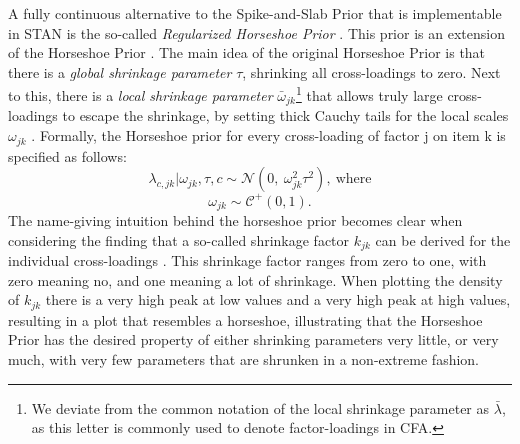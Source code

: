 \documentclass[]{interact}
\theoremstyle{plain}%
\theoremstyle{definition}
\theoremstyle{remark}
\begin{document}
A fully continuous alternative to the Spike-and-Slab Prior that is
implementable in STAN is the so-called \emph{Regularized Horseshoe
Prior}
\citep[RHSP,][]{piironen_hyperprior_2017, piironen_sparsity_2017}. This
prior is an extension of the Horseshoe Prior
\citep{carvalho_horseshoe_2010}. The main idea of the original Horseshoe
Prior is that there is a \emph{global shrinkage parameter} \(\tau\),
shrinking all cross-loadings to zero. Next to this, there is a
\emph{local shrinkage parameter} \(\bar{\omega}_{jk}\)\footnote{We
  deviate from the common notation of the local shrinkage parameter as
  \(\bar{\lambda}\), as this letter is commonly used to denote
  factor-loadings in CFA.} that allows truly large cross-loadings to
escape the shrinkage, by setting thick Cauchy tails for the local scales
\(\omega_{jk}\) \citep{polson_shrink_2010}. Formally, the Horseshoe
prior for every cross-loading of factor j on item k is specified as
follows:
\[\lambda_{c,jk} | \omega_{jk}, \tau, c\sim \mathcal{N}(0, \ \omega^2_{jk} \tau^2), \ \text{where}\]
\[\omega_{jk} \sim \mathcal{C^+}(0, 1).\] The name-giving intuition
behind the horseshoe prior becomes clear when considering the finding
that a so-called shrinkage factor \(k_{jk}\) can be derived for the
individual cross-loadings
\citep{carvalho_horseshoe_2010, piironen_sparsity_2017}. This shrinkage
factor ranges from zero to one, with zero meaning no, and one meaning a
lot of shrinkage. When plotting the density of \(k_{jk}\) there is a
very high peak at low values and a very high peak at high values,
resulting in a plot that resembles a horseshoe, illustrating that the
Horseshoe Prior has the desired property of either shrinking parameters
very little, or very much, with very few parameters that are shrunken in
a non-extreme fashion.
\end{document}
